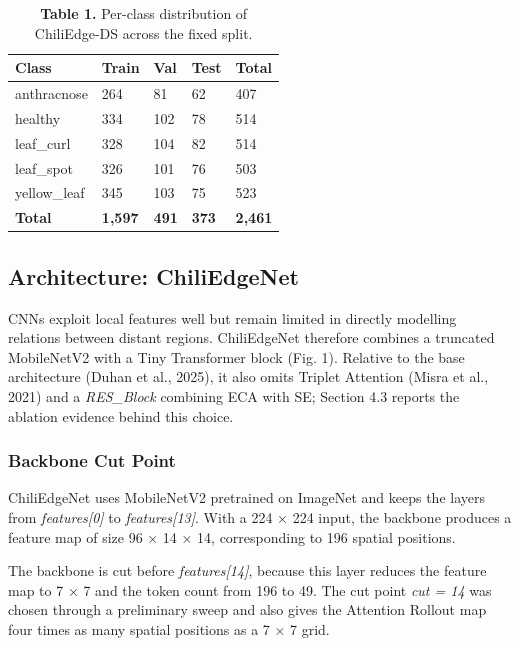 \begin{table}[H]
\centering
\caption*{\textbf{Table 1.} Per-class distribution of ChiliEdge-DS across the fixed split.}
\label{tab:1}
\footnotesize
\renewcommand{\arraystretch}{1.15}
\begin{tabular}{lllll}
\toprule
\textbf{Class} & \textbf{Train} & \textbf{Val} & \textbf{Test} & \textbf{Total} \\
\midrule
anthracnose & 264 & 81 & 62 & 407 \\
healthy & 334 & 102 & 78 & 514 \\
leaf\_curl & 328 & 104 & 82 & 514 \\
leaf\_spot & 326 & 101 & 76 & 503 \\
yellow\_leaf & 345 & 103 & 75 & 523 \\
\textbf{Total} & \textbf{1,597} & \textbf{491} & \textbf{373} & \textbf{2,461} \\
\bottomrule
\end{tabular}
\end{table}

\subsection{Architecture: ChiliEdgeNet}\label{architecture-chiliedgenet}

CNNs exploit local features well but remain limited in directly modelling relations between distant regions. ChiliEdgeNet therefore combines a truncated MobileNetV2 with a Tiny Transformer block (Fig. 1). Relative to the base architecture (Duhan et al., 2025), it also omits Triplet Attention (Misra et al., 2021) and a \emph{RES\_Block} combining ECA with SE; Section 4.3 reports the ablation evidence behind this choice.

\subsubsection{Backbone Cut Point}\label{backbone-cut-point}

ChiliEdgeNet uses MobileNetV2 pretrained on ImageNet and keeps the layers from \emph{features{[}0{]}} to \emph{features{[}13{]}}. With a 224 × 224 input, the backbone produces a feature map of size 96 × 14 × 14, corresponding to 196 spatial positions.

The backbone is cut before \emph{features{[}14{]}}, because this layer reduces the feature map to 7 × 7 and the token count from 196 to 49. The cut point \emph{cut = 14} was chosen through a preliminary sweep and also gives the Attention Rollout map four times as many spatial positions as a 7 × 7 grid.

